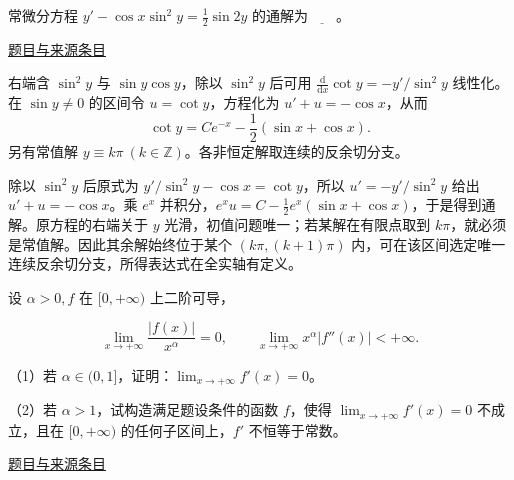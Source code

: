 \documentclass[UTF8,12pt,a4paper,fontset=fandol]{ctexart}
\begin{document}
\begin{example}[来源序号4]\label{ex:fin13-high:4}\label{pr:fin13-high:4}

常微分方程 $y' - \cos x \sin^2 y = \frac{1}{2} \sin 2y$ 的通解为$\underline{\qquad}$。

\par\href{https://github.com/lzxcr/cmc-mathematics/blob/64916fa1fdbc3e444a652eca204d5669058ee321/src/problems/finals/13/04.md}{题目与来源条目}

\end{example}

\begin{solve}\label{ans:fin13-high:4}

右端含 $\sin^2y$ 与 $\sin y\cos y$，除以 $\sin^2y$ 后可用 $\frac{\mathrm d}{\mathrm dx}\cot y=-y'/\sin^2y$ 线性化。在 $\sin y\ne0$ 的区间令 $u=\cot y$，方程化为 $u'+u=-\cos x$，从而
\[
\boxed{\cot y=Ce^{-x}-\frac12(\sin x+\cos x)}.
\]
另有常值解 $\boxed{y\equiv k\pi\ (k\in\mathbb Z)}$。各非恒定解取连续的反余切分支。

除以 $\sin^2y$ 后原式为 $y'/\sin^2y-\cos x=\cot y$，所以 $u'=-y'/\sin^2y$ 给出 $u'+u=-\cos x$。乘 $e^x$ 并积分，$e^xu=C-\tfrac12e^x(\sin x+\cos x)$，于是得到通解。原方程的右端关于 $y$ 光滑，初值问题唯一；若某解在有限点取到 $k\pi$，就必须是常值解。因此其余解始终位于某个 $(k\pi,(k+1)\pi)$ 内，可在该区间选定唯一连续反余切分支，所得表达式在全实轴有定义。

\end{solve}

\begin{example}[来源序号7]\label{ex:fin13-high:7}\label{pr:fin13-high:7}

设 $\alpha > 0, f$ 在 $[0,+\infty)$ 上二阶可导，

\[
\lim_{x \rightarrow +\infty} \frac{|f(x)|}{x^\alpha} = 0, \qquad \lim_{x \rightarrow +\infty} x^\alpha |f''(x)| < +\infty.
\]

（1）若 $\alpha \in (0,1]$，证明：$\lim_{x \rightarrow +\infty} f'(x) = 0$。

（2）若 $\alpha > 1$，试构造满足题设条件的函数 $f$，使得 $\lim_{x \rightarrow +\infty} f'(x) = 0$ 不成立，且在 $[0,+\infty)$ 的任何子区间上，$f'$ 不恒等于常数。

\par\href{https://github.com/lzxcr/cmc-mathematics/blob/64916fa1fdbc3e444a652eca204d5669058ee321/src/problems/finals/13/07.md}{题目与来源条目}

\end{example}
\end{document}
